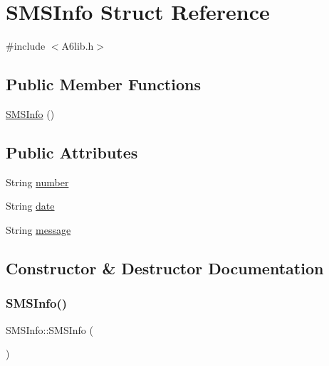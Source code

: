 \hypertarget{struct_s_m_s_info}{}\section{S\+M\+S\+Info Struct Reference}
\label{struct_s_m_s_info}


{\ttfamily \#include $<$A6lib.\+h$>$}

\subsection*{Public Member Functions}
\begin{DoxyCompactItemize}
\item 
\mbox{\hyperlink{struct_s_m_s_info_a2c5d2f255be91fb8582a5a33c3870a35}{S\+M\+S\+Info}} ()
\end{DoxyCompactItemize}
\subsection*{Public Attributes}
\begin{DoxyCompactItemize}
\item 
String \mbox{\hyperlink{struct_s_m_s_info_ad4574e2c51baaf47d01e738b6f2ecf41}{number}}
\item 
String \mbox{\hyperlink{struct_s_m_s_info_a79e458b6eab58167605195322c26ee6f}{date}}
\item 
String \mbox{\hyperlink{struct_s_m_s_info_aa6acfef8d31d0b57f04e3782faf550bb}{message}}
\end{DoxyCompactItemize}


\subsection{Constructor \& Destructor Documentation}
\mbox{\label{struct_s_m_s_info_a2c5d2f255be91fb8582a5a33c3870a35}} 
\subsubsection{\texorpdfstring{S\+M\+S\+Info()}{SMSInfo()}}
{\footnotesize\ttfamily S\+M\+S\+Info\+::\+S\+M\+S\+Info (\begin{DoxyParamCaption}{ }\end{DoxyParamCaption})\hspace{0.3cm}{\ttfamily [inline]}}



